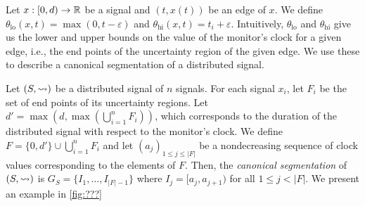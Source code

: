 Let $x : [0,d) \to \mathbb{R}$ be a signal and $(t, x(t))$ be an edge of $x$. %
We define $\theta_{\text{lo}}(x,t) = \max(0, t - \varepsilon)$ and $\theta_{\text{hi}}(x,t) = t_i + \varepsilon$.
Intuitively, $\theta_{\text{lo}}$ and $\theta_{\text{hi}}$ give us the lower and upper bounds on the value of the monitor's clock for a given edge, i.e., the end points of the uncertainty region of the given edge.
We use these to describe a canonical segmentation of a distributed signal.

Let $(S,{\rightsquigarrow})$ be a distributed signal of $n$ signals.
For each signal $x_i$, let $F_i$ be the set of end points of its uncertainty regions.
Let $d' = \max(d, \max (\bigcup_{i = 1}^{n} F_i))$, which corresponds to the duration of the distributed signal with respect to the monitor's clock.
%
We define $F = \{0, d'\} \cup \bigcup_{i = 1}^{n} F_i$ and let $(a_j)_{1 \leq j \leq |F|}$ be a nondecreasing sequence of clock values corresponding to the elements of $F$.
Then, the \emph{canonical segmentation} of $(S,{\rightsquigarrow})$ is $G_S = \{I_1, \ldots, I_{|F| - 1}\}$ where $I_j = [a_j, a_{j+1})$ for all $1 \leq j < |F|$.
We present an example in \cref{fig:???}


